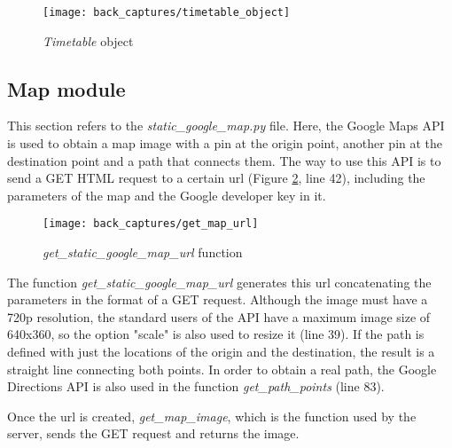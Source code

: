 	\begin{figure}[!ht]
		\centering
		\texttt{[image: back\_captures/timetable\_object]}
		\caption{\textit{Timetable} object}
		\label{fig:timetable_object}
	\end{figure}
	
	\subsection{Map module}
	\label{subsec:map_module}
	This section refers to the \textit{static{\_}google{\_}map.py} file. Here, the Google Maps API is used to obtain a map image with a pin at the origin point, another pin at the destination point and a path that connects them. The way to use this API is to send a GET HTML request to a certain url (Figure \ref{fig:get_map_url_function}, line 42), including the parameters of the map and the Google developer key in it. 

	\begin{figure}[!ht]
		\centering
		\texttt{[image: back\_captures/get\_map\_url]}
		\caption{\textit{get{\_}static{\_}google{\_}map{\_}url} function}
		\label{fig:get_map_url_function}
	\end{figure}

	The function \textit{get{\_}static{\_}google{\_}map{\_}url} generates this url concatenating the parameters in the format of a GET request. Although the image must have a \gls{720p} resolution, the standard users of the API have a maximum image size of 640x360, so the option "scale" is also used to resize it (line 39). If the path is defined with just the locations of the origin and the destination, the result is a straight line connecting both points. In order to obtain a real path, the Google Directions API is also used in the function \textit{get{\_}path{\_}points} (line 83).

	Once the url is created, \textit{get{\_}map{\_}image}, which is the function used by the server, sends the GET request and returns the image.
	


                                                    
